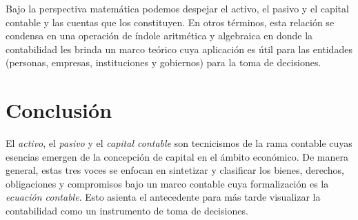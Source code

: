 \documentclass[12pt]{article}
\begin{document}
	Bajo la perspectiva matemática podemos despejar el activo, el pasivo y el capital contable y las cuentas que los constituyen. En otros términos, esta relación se condensa en una operación de índole aritmética y algebraica en donde la contabilidad les brinda un marco teórico cuya aplicación es útil para las entidades (personas, empresas, instituciones y gobiernos) para la toma de decisiones.

\section{Conclusión}

El \emph{activo}, el \emph{pasivo} y el \emph{capital contable} son tecnicismos de la rama contable cuyas esencias emergen de la concepción de capital en el ámbito económico. De manera general, estas tres voces se enfocan en sintetizar y clasificar los bienes, derechos, obligaciones y compromisos bajo un marco contable cuya formalización es la \emph{ecuación contable}. Esto asienta el antecedente para más tarde visualizar la contabilidad como un instrumento de toma de decisiones.


\nocite{*}
\printbibliography[heading=bibintoc]
\end{document}
